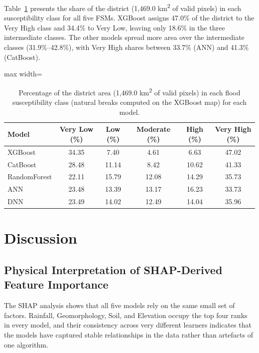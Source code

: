 \documentclass[12pt, a4paper]{article}
\begin{document}
Table~\ref{tab:area} presents the share of the district (1,469.0 km\textsuperscript{2} of valid pixels) in each susceptibility class for all five FSMs. XGBoost assigns 47.0\% of the district to the Very High class and 34.4\% to Very Low, leaving only 18.6\% in the three intermediate classes. The other models spread more area over the intermediate classes (31.9\%--42.8\%), with Very High shares between 33.7\% (ANN) and 41.3\% (CatBoost).

\begin{table}[H]
\centering
\caption{Percentage of the district area (1,469.0 km\textsuperscript{2} of valid pixels) in each flood susceptibility class (natural breaks computed on the XGBoost map) for each model.}
\label{tab:area}
\begin{adjustbox}{max width=\linewidth}
\begin{tabular}{lccccc}
\toprule
\textbf{Model} & \textbf{Very Low (\%)} & \textbf{Low (\%)} & \textbf{Moderate (\%)} & \textbf{High (\%)} & \textbf{Very High (\%)} \\
\midrule
XGBoost      & 34.35 & 7.40  & 4.61  & 6.63  & 47.02 \\
CatBoost     & 28.48 & 11.14 & 8.42  & 10.62 & 41.33 \\
RandomForest & 22.11 & 15.79 & 12.08 & 14.29 & 35.73 \\
ANN          & 23.48 & 13.39 & 13.17 & 16.23 & 33.73 \\
DNN          & 23.49 & 14.02 & 12.49 & 14.04 & 35.96 \\
\end{tabular}
\end{adjustbox}
\end{table}

\section{Discussion}

\subsection{Physical Interpretation of SHAP-Derived Feature Importance}
\label{sec:disc_shap}

The SHAP analysis shows that all five models rely on the same small set of factors. Rainfall, Geomorphology, Soil, and Elevation occupy the top four ranks in every model, and their consistency across very different learners indicates that the models have captured stable relationships in the data rather than artefacts of one algorithm.
\end{document}
